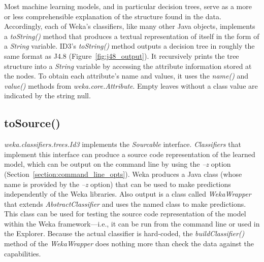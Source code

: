 Most machine learning models, and in particular decision trees, serve
as a more or less comprehensible explanation of the structure found in
the data. Accordingly, each of Weka's classifiers, like many other
Java objects, implements a \textit{toString()} method that produces a textual
representation of itself in the form of a \textit{String} variable. ID3's
\textit{toString()} method outputs a decision tree in roughly the same format
as J4.8 (Figure~\ref{fig:j48_output}). It recursively prints the tree structure into a
\textit{String} variable by accessing the attribute information stored at the
nodes. To obtain each attribute's name and values, it uses
the \textit{name()} and \textit{value()} methods
from \textit{weka.core.Attribute}. Empty leaves without a class value
are indicated by the string null.

\subsection{toSource()}

\textit{weka.classifiers.trees.Id3} implements the \textit{Sourcable}
interface. \textit{Classifiers} that implement this interface can
produce a source code representation of the learned model, which can
be output on the command line by using the \textit{--z} option
(Section~\ref{section:command_line_opts}). Weka produces a Java class
(whose name is provided by the \textit{--z} option) that can be used
to make predictions independently of the Weka libraries. Also output
is a class called \textit{WekaWrapper} that extends
\textit{AbstractClassifier} and uses the named class to make predictions. This class
can be used for testing the source code representation of the model
within the Weka framework---i.e., it can be run from the command line or
used in the Explorer. Because the actual classifier is hard-coded, the
\textit{buildClassifier()} method of the \textit{WekaWrapper} does nothing more than
check the data against the capabilities.


